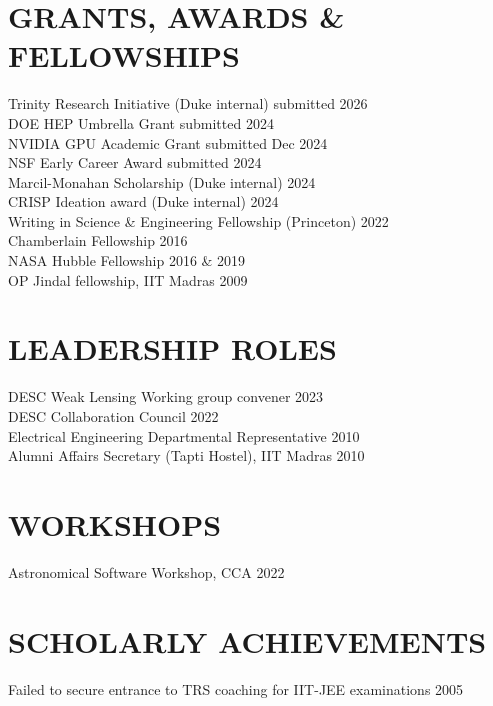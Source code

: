 \documentclass[margin, 9pt]{res} %
\begin{document}
\begin{resume}
\section{GRANTS, AWARDS \& FELLOWSHIPS}
Trinity Research Initiative (Duke internal) \hfill submitted 2026\\
DOE HEP Umbrella Grant \hfill submitted 2024\\
NVIDIA GPU Academic Grant \hfill submitted Dec 2024\\
NSF Early Career Award \hfill submitted 2024\\
Marcil-Monahan Scholarship (Duke internal) \hfill 2024\\
CRISP Ideation award (Duke internal) \hfill 2024\\
Writing in Science \& Engineering Fellowship (Princeton) \hfill 2022\\
Chamberlain Fellowship \hfill 2016\\
NASA Hubble Fellowship \hfill 2016 \& 2019\\
OP Jindal fellowship, IIT  Madras \hfill 2009\\


\section{LEADERSHIP ROLES}
DESC Weak Lensing Working group convener \hfill 2023\\
DESC Collaboration Council \hfill 2022\\
Electrical Engineering Departmental Representative \hfill 2010\\
Alumni Affairs Secretary (Tapti Hostel), IIT Madras \hfill 2010\\

\section{WORKSHOPS}
 Astronomical Software Workshop, CCA \hfill 2022\\



\section{SCHOLARLY ACHIEVEMENTS}
Failed to secure entrance to TRS coaching for IIT-JEE examinations \hfill 2005\\


\end{resume}
\end{document}
